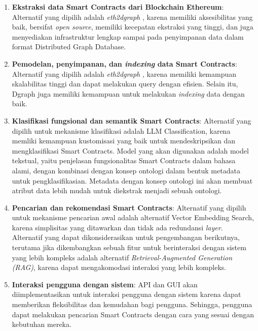 \begin{enumerate}
	\item \textbf{Ekstraksi data Smart Contracts dari Blockchain Ethereum}: Alternatif yang dipilih adalah \textit{eth2dgraph} \parencite{aimar2023extraction}, karena memiliki aksesibilitas yang baik, bersifat \textit{open source}, memiliki kecepatan ekstraksi yang tinggi, dan juga menyediakan infrastruktur lengkap sampai pada penyimpanan data dalam format Distributed Graph Database.
	\item \textbf{Pemodelan, penyimpanan, dan \textit{indexing} data Smart Contracts}: Alternatif yang dipilih adalah \textit{eth2dgraph} \parencite{aimar2023extraction}, karena memiliki kemampuan skalabilitas tinggi dan dapat melakukan query dengan efisien. Selain itu, Dgraph juga memiliki kemampuan untuk melakukan \textit{indexing} data dengan baik.
	\item \textbf{Klasifikasi fungsional dan semantik Smart Contracts}: Alternatif yang dipilih untuk mekanisme klasifikasi adalah LLM Classification, karena memliki kemampuan kustomisasi yang baik untuk mendeskripsikan dan mengklasifikasi Smart Contracts. Model yang akan digunakan adalah model tekstual, yaitu penjelasan fungsionalitas Smart Contracts dalam bahasa alami, dengan kombinasi dengan konsep ontologi dalam bentuk metadata untuk pengklasifikasian. Metadata dengan konsep ontologi ini akan membuat atribut data lebih mudah untuk diekstrak menjadi sebuah ontologi.
	\item \textbf{Pencarian dan rekomendasi Smart Contracts}: Alternatif yang dipilih untuk mekanisme pencarian awal adalah alternatif Vector Embedding Search, karena simplisitas yang ditawarkan dan tidak ada redundansi \textit{layer}. Alternatif yang dapat dikonsiderasikan untuk pengembangan berikutnya, terutama jika dikembangkan sebuah fitur untuk berinteraksi dengan sistem yang lebih kompleks adalah alternatif \textit{Retrieval-Augmented Generation (RAG)}, karena dapat mengakomodasi interaksi yang lebih kompleks.
	\item \textbf{Interaksi pengguna dengan sistem}: API dan GUI akan diimplementasikan untuk interaksi pengguna dengan sistem karena dapat memberikan fleksibilitas dan kemudahan bagi pengguna. Sehingga, pengguna dapat melakukan pencarian Smart Contracts dengan cara yang sesuai dengan kebutuhan mereka.
\end{enumerate}
